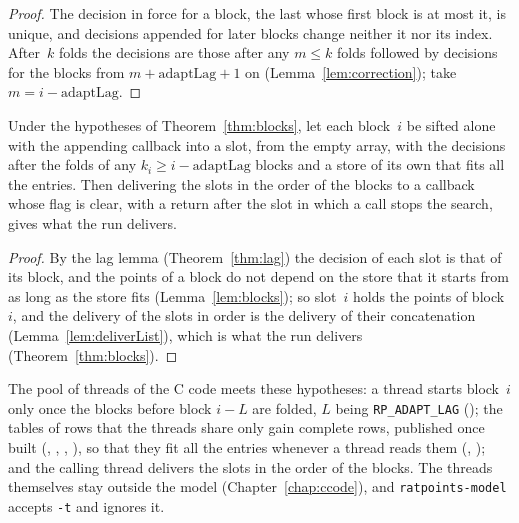 \begin{proof}
  \leanok
  The decision in force for a block, the last whose first block is at most it, is unique, and
  decisions appended for later blocks change neither it nor its index. After~$k$ folds the decisions
  are those after any $m \le k$ folds followed by decisions for the blocks from
  $m + \mathrm{adaptLag} + 1$ on (Lemma~\ref{lem:correction}); take $m = i - \mathrm{adaptLag}$.
\end{proof}

\begin{theorem}\label{thm:threads}
  \leanok
  Under the hypotheses of Theorem~\ref{thm:blocks}, let each block~$i$ be sifted alone with the
  appending callback into a slot, from the empty array, with the decisions after the folds of any
  $k_i \ge i - \mathrm{adaptLag}$ blocks and a store of its own that fits all the entries. Then
  delivering the slots in the order of the blocks to a callback whose flag is clear, with a return
  after the slot in which a call stops the search, gives what the run delivers.
\end{theorem}

\begin{proof}
  \leanok
  By the lag lemma (Theorem~\ref{thm:lag}) the decision of each slot is that of its block, and the
  points of a block do not depend on the store that it starts from as long as the store fits
  (Lemma~\ref{lem:blocks}); so slot~$i$ holds the points of block~$i$, and the delivery of the slots
  in order is the delivery of their concatenation (Lemma~\ref{lem:deliverList}), which is what the
  run delivers (Theorem~\ref{thm:blocks}).
\end{proof}

The pool of threads of the C code meets these hypotheses: a thread starts block~$i$ only once the
blocks before block $i - L$ are folded, $L$ being \verb|RP_ADAPT_LAG|
(); the tables of rows that the threads share only gain complete
rows, published once built (, ,
, ), so that they fit all the entries whenever a
thread reads them (, ); and
the calling thread delivers the slots in the order of the blocks. The threads themselves stay
outside the model (Chapter~\ref{chap:ccode}), and \verb|ratpoints-model| accepts \verb|-t| and
ignores it.

